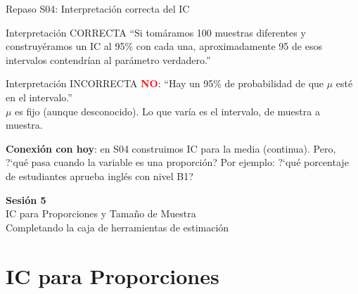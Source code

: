 \documentclass[aspectratio=169, 11pt]{beamer}
\begin{document}
\begin{frame}{Repaso S04: Interpretaci\'on correcta del IC}
\small
\begin{alertblock}{Interpretaci\'on CORRECTA}
``Si tom\'aramos 100 muestras diferentes y construy\'eramos un IC al 95\% con cada una, aproximadamente \alert{95 de esos intervalos} contendr\'ian al par\'ametro verdadero.''
\end{alertblock}

\begin{block}{Interpretaci\'on INCORRECTA}
\textcolor{red}{\textbf{NO}}: ``Hay un 95\% de probabilidad de que $\mu$ est\'e en el intervalo.''\\[0.3em]
$\mu$ es fijo (aunque desconocido). Lo que var\'ia es el intervalo, de muestra a muestra.
\end{block}

\textbf{Conexi\'on con hoy}: en S04 construimos IC para la media (continua). Pero, ?`qu\'e pasa cuando la variable es una \alert{proporci\'on}? Por ejemplo: ?`qu\'e porcentaje de estudiantes aprueba ingl\'es con nivel B1?
\end{frame}

\begin{frame}{}
\vfill
\centering
{\Large\textbf{Sesi\'on 5}}\\[1em]
{\normalsize IC para Proporciones y Tama\~no de Muestra}\\[0.5em]
{\small Completando la caja de herramientas de estimaci\'on}
\vfill
\end{frame}

\section{IC para Proporciones}
\end{document}
